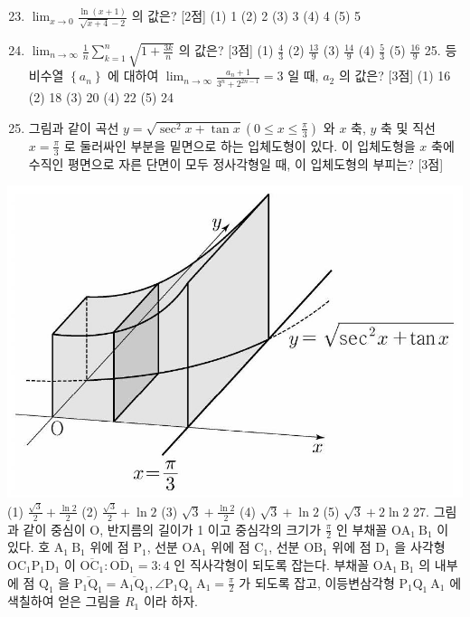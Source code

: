 \documentclass[10pt]{article}
\begin{document}
\begin{enumerate}
  \setcounter{enumi}{22}
  \item $\lim _{x \rightarrow 0} \frac{\ln (x+1)}{\sqrt{x+4}-2}$ 의 값은? [2점]
(1) 1
(2) 2
(3) 3
(4) 4
(5) 5

  \item $\lim _{n \rightarrow \infty} \frac{1}{n} \sum_{k=1}^{n} \sqrt{1+\frac{3 k}{n}}$ 의 값은? [3점]
(1) $\frac{4}{3}$
(2) $\frac{13}{9}$
(3) $\frac{14}{9}$
(4) $\frac{5}{3}$
(5) $\frac{16}{9}$ 25. 등비수열 $\left\{a_{n}\right\}$ 에 대하여 $\lim _{n \rightarrow \infty} \frac{a_{n}+1}{3^{n}+2^{2 n-1}}=3$ 일 때, $a_{2}$ 의 값은? [3점]
(1) 16
(2) 18
(3) 20
(4) 22
(5) 24

  \item 그림과 같이 곡선 $y=\sqrt{\sec ^{2} x+\tan x}\left(0 \leq x \leq \frac{\pi}{3}\right)$ 와 $x$ 축, $y$ 축 및 직선 $x=\frac{\pi}{3}$ 로 둘러싸인 부분을 밑면으로 하는 입체도형이 있다. 이 입체도형을 $x$ 축에 수직인 평면으로 자른 단면이 모두 정사각형일 때, 이 입체도형의 부피는? [3점]

\end{enumerate}

\includegraphics[max width=\textwidth, center]{2023_05_19_a9cef858603f6abf5411g-34}
(1) $\frac{\sqrt{3}}{2}+\frac{\ln 2}{2}$
(2) $\frac{\sqrt{3}}{2}+\ln 2$
(3) $\sqrt{3}+\frac{\ln 2}{2}$
(4) $\sqrt{3}+\ln 2$
(5) $\sqrt{3}+2 \ln 2$ 27. 그림과 같이 중심이 $\mathrm{O}$, 반지름의 길이가 1 이고 중심각의 크기가 $\frac{\pi}{2}$ 인 부채꼴 $\mathrm{OA}_{1} \mathrm{~B}_{1}$ 이 있다. 호 $\mathrm{A}_{1} \mathrm{~B}_{1}$ 위에 점 $\mathrm{P}_{1}$, 선분 $\mathrm{OA}_{1}$ 위에 점 $\mathrm{C}_{1}$, 선분 $\mathrm{OB}_{1}$ 위에 점 $\mathrm{D}_{1}$ 을 사각형 $\mathrm{OC}_{1} \mathrm{P}_{1} \mathrm{D}_{1}$ 이 $\overline{\mathrm{OC}_{1}}: \overline{\mathrm{OD}_{1}}=3: 4$ 인 직사각형이 되도록 잡는다. 부채꼴 $\mathrm{OA}_{1} \mathrm{~B}_{1}$ 의 내부에 점 $\mathrm{Q}_{1}$ 을 $\overline{\mathrm{P}_{1} \mathrm{Q}_{1}}=\overline{\mathrm{A}_{1} \mathrm{Q}_{1}}, \angle \mathrm{P}_{1} \mathrm{Q}_{1} \mathrm{~A}_{1}=\frac{\pi}{2}$ 가 되도록 잡고, 이등변삼각형 $\mathrm{P}_{1} \mathrm{Q}_{1} \mathrm{~A}_{1}$ 에 색칠하여 얻은 그림을 $R_{1}$ 이라 하자.
\end{document}
